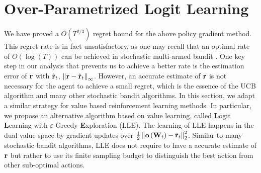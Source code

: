 \section{Over-Parametrized Logit Learning}
\label{sec:logit_learning}

We have proved a $O(T^{2/3})$ regret bound for the above policy gradient method.
This regret rate is in fact unsatisfactory,  as one may recall that an optimal rate of $O(\log(T))$ can be achieved in stochastic multi-armed bandit \citep{bubeck2012regret}. 
One key step in our analysis that prevents us to achieve a better rate is the estimation error of ${\mathbf{r}}$ with $\hat{{\mathbf{r}}}_t$, $\left\| {\mathbf{r}} - \hat{{\mathbf{r}}}_t \right\|_\infty$.
However, an accurate estimate of ${\mathbf{r}}$ is not necessary for the agent to achieve a small regret, which is the essence of the UCB algorithm and many other stochastic bandit algorithms. 
In this section, we adapt a similar strategy for value based reinforcement learning methods.
In particular, we propose an alternative algorithm based on value learning, called {\bf L}ogit {\bf L}earning with $\varepsilon$-Greedy {\bf E}xploration (LLE).
The learning of LLE happens in the dual value space by gradient updates over $\frac{1}{2} \left\| {\mathbf{o}}\left( {\mathbf{W}}_t\right) - \hat{{\mathbf{r}}}_t \right\|_2^2$. 
Similar to many stochastic bandit algorithms, LLE does not require to have a accurate estimate of ${\mathbf{r}}$ but rather to use its finite sampling budget to distinguish the best action from other sub-optimal actions.

